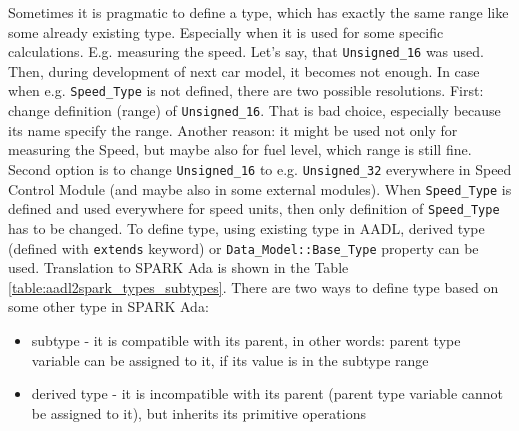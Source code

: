 Sometimes it is pragmatic to define a type, which has exactly the same range like some already existing type. Especially when it is used for some specific calculations. E.g. measuring the speed. Let's say, that \lstinline{Unsigned_16} was used. Then, during development of next car model, it becomes not enough. In case when e.g. \lstinline{Speed_Type} is not defined, there are two possible resolutions. First: change definition (range) of \lstinline{Unsigned_16}. That is bad choice, especially because its name specify the range. Another reason: it might be used not only for measuring the Speed, but maybe also for fuel level, which range is still fine. Second option is to change \lstinline{Unsigned_16} to e.g. \lstinline{Unsigned_32} everywhere in Speed Control Module (and maybe also in some external modules). When \lstinline{Speed_Type} is defined and used everywhere for speed units, then only definition of \lstinline{Speed_Type} has to be changed. To define type, using existing type in AADL, derived type (defined with \lstinline{extends} keyword) or \lstinline{Data_Model::Base_Type} property can be used. Translation to SPARK Ada is shown in the Table \ref{table:aadl2spark_types_subtypes}. There are two ways to define type based on some other type in SPARK Ada:

\begin{itemize}
	\item subtype - it is compatible with its parent, in other words: parent type variable can be assigned to it, if its value is in the subtype range
	\item derived type - it is incompatible with its parent (parent type variable cannot be assigned to it), but inherits its primitive operations
\end{itemize}

